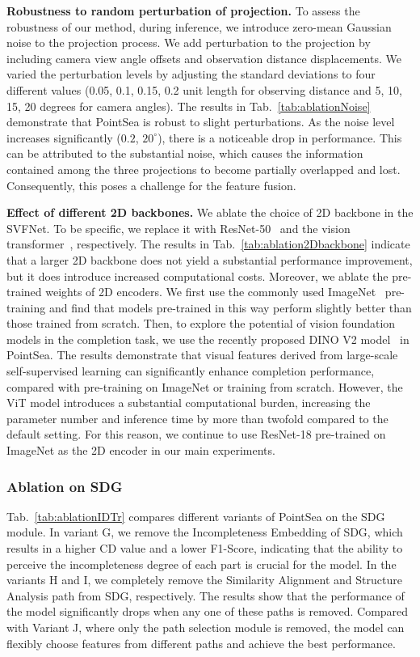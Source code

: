 \noindent\textbf{Robustness to random perturbation of projection.} 
To assess the robustness of our method, during inference, we introduce zero-mean Gaussian noise to the projection process. We add perturbation to the projection by including camera view angle offsets and observation distance displacements. We varied the perturbation levels by adjusting the standard deviations to four different values (0.05, 0.1, 0.15, 0.2 unit length for observing distance and 5, 10, 15, 20 degrees for camera angles). The results in Tab.~\ref{tab:ablationNoise} demonstrate that PointSea is robust to slight perturbations. As the noise level increases significantly ({$0.2$, $20^{\circ}$}), there is a noticeable drop in performance. This can be attributed to the substantial noise, which causes the information contained among the three projections to become partially overlapped and lost. Consequently, this poses a challenge for the feature fusion.


\noindent\textbf{Effect of different 2D backbones.} 
We ablate the choice of 2D backbone in the SVFNet. To be specific, we replace it with ResNet-50~\citep{he2016deep} and the vision transformer~\citep{dosovitskiy2021an}, respectively. The results in Tab.~\ref{tab:ablation2Dbackbone} indicate that a larger 2D backbone does not yield a substantial performance improvement, but it does introduce increased computational costs. 
Moreover, we ablate the pre-trained weights of 2D encoders. We first use the commonly used ImageNet~\citep{5206848} pre-training and find that models pre-trained in this way perform slightly better than those trained from scratch.
Then, to explore the potential of vision foundation models in the completion task, we use the recently proposed DINO V2 model~\citep{dinov2} in PointSea. The results demonstrate that visual features derived from large-scale self-supervised learning can significantly enhance completion performance, compared with pre-training on ImageNet or training from scratch.
However, the ViT model introduces a substantial computational burden, increasing the parameter number and inference time by more than twofold compared to the default setting. For this reason, we continue to use ResNet-18 pre-trained on ImageNet as the 2D encoder in our main experiments.


\subsubsection{Ablation on SDG}
Tab.~\ref{tab:ablationIDTr} compares different variants of PointSea on the SDG module. In variant G, we remove the Incompleteness Embedding of SDG, which results in a higher CD value and a lower F1-Score, indicating that the ability to perceive the incompleteness degree of each part is crucial for the model. In the variants H and I, we completely remove the Similarity Alignment and Structure Analysis path from SDG, respectively. The results show that the performance of the model significantly drops when any one of these paths is removed.
Compared with Variant J, where only the path selection module is removed, the model can flexibly choose features from different paths and achieve the best performance.

